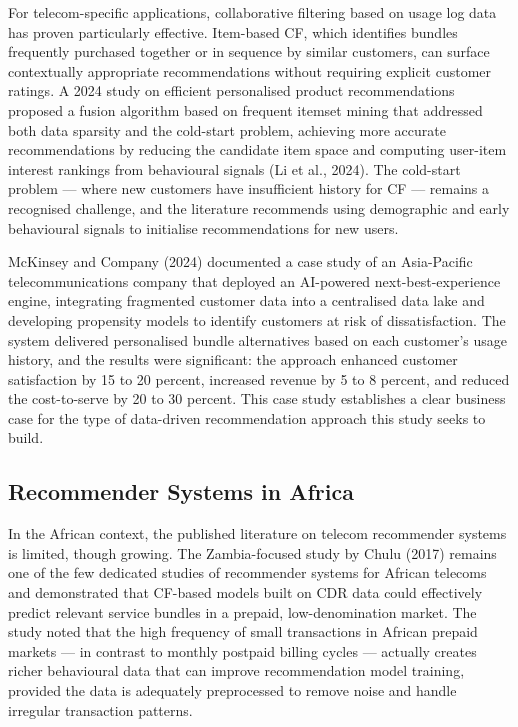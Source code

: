 For telecom-specific applications, collaborative filtering based on usage log data has proven particularly effective. Item-based CF, which identifies bundles frequently purchased together or in sequence by similar customers, can surface contextually appropriate recommendations without requiring explicit customer ratings. A 2024 study on efficient personalised product recommendations proposed a fusion algorithm based on frequent itemset mining that addressed both data sparsity and the cold-start problem, achieving more accurate recommendations by reducing the candidate item space and computing user-item interest rankings from behavioural signals (Li et al., 2024). The cold-start problem --- where new customers have insufficient history for CF --- remains a recognised challenge, and the literature recommends using demographic and early behavioural signals to initialise recommendations for new users.

McKinsey and Company (2024) documented a case study of an Asia-Pacific telecommunications company that deployed an AI-powered next-best-experience engine, integrating fragmented customer data into a centralised data lake and developing propensity models to identify customers at risk of dissatisfaction. The system delivered personalised bundle alternatives based on each customer's usage history, and the results were significant: the approach enhanced customer satisfaction by 15 to 20 percent, increased revenue by 5 to 8 percent, and reduced the cost-to-serve by 20 to 30 percent. This case study establishes a clear business case for the type of data-driven recommendation approach this study seeks to build.


\subsection{Recommender Systems in Africa}

In the African context, the published literature on telecom recommender systems is limited, though growing. The Zambia-focused study by Chulu (2017) remains one of the few dedicated studies of recommender systems for African telecoms and demonstrated that CF-based models built on CDR data could effectively predict relevant service bundles in a prepaid, low-denomination market. The study noted that the high frequency of small transactions in African prepaid markets --- in contrast to monthly postpaid billing cycles --- actually creates richer behavioural data that can improve recommendation model training, provided the data is adequately preprocessed to remove noise and handle irregular transaction patterns.

